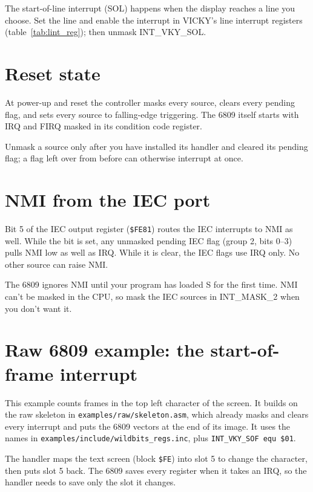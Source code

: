 The start-of-line interrupt (SOL) happens when the display reaches a line you choose. Set the line and enable the interrupt in VICKY's line interrupt registers (table~\ref{tab:lint_reg}); then unmask INT\_VKY\_SOL.

\section{Reset state}

At power-up and reset the controller masks every source, clears every pending flag, and sets every source to falling-edge triggering. The 6809 itself starts with IRQ and FIRQ masked in its condition code register.

Unmask a source only after you have installed its handler and cleared its pending flag; a flag left over from before can otherwise interrupt at once.

\section{NMI from the IEC port}
\label{sec:int_nmi}

Bit 5 of the IEC output register (\verb+$FE81+) routes the IEC interrupts to NMI as well. While the bit is set, any unmasked pending IEC flag (group 2, bits 0--3) pulls NMI low as well as IRQ. While it is clear, the IEC flags use IRQ only. No other source can raise NMI. 

The 6809 ignores NMI until your program has loaded S for the first time. NMI can't be masked in the CPU, so mask the IEC sources in INT\_MASK\_2 when you don't want it.

\section{Raw 6809 example: the start-of-frame interrupt}

This example counts frames in the top left character of the screen. It builds on the raw skeleton in \verb+examples/raw/skeleton.asm+, which already masks and clears every interrupt and puts the 6809 vectors at the end of its image. It uses the names in \verb+examples/include/wildbits_regs.inc+, plus \verb+INT_VKY_SOF equ $01+.

The handler maps the text screen (block \verb+$FE+) into slot 5 to change the character, then puts slot 5 back. The 6809 saves every register when it takes an IRQ, so the handler needs to save only the slot it changes.

